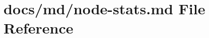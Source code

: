 \hypertarget{node-stats_8md}{}\section{docs/md/node-\/stats.md File Reference}
\label{node-stats_8md}

